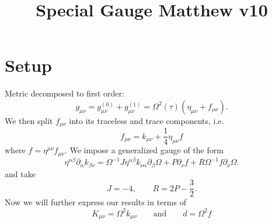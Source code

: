 \documentclass[10pt,letterpaper]{article}
\title{Special Gauge Matthew v10}
\date{}
\begin{document}
\maketitle
\noindent
\section*{Setup}
Metric decomposed to first order:
\begin{equation}
g_{\mu\nu} = g^{(0)}_{\mu\nu} + g^{(1)}_{\mu\nu} = \Omega^2(\tau)(\eta_{\mu\nu}+f_{\mu\nu}).
\end{equation}
We then split $f_{\mu\nu}$ into its traceless and trace components, i.e.
\begin{equation}
	f_{\mu\nu} = k_{\mu\nu} + \frac 14 \eta_{\mu\nu}f
\end{equation}
where $f = \eta^{\mu\nu}f_{\mu\nu}$. 
We impose a generalized gauge of the form
\begin{equation}
	\eta^{\alpha\beta}\partial_{\alpha}k_{\beta\nu} = \Omega^{-1} J \eta^{\alpha\beta}k_{\nu\alpha}\partial_\beta \Omega + P \partial_\nu f + R \Omega^{-1} f \partial_\nu \Omega.
\end{equation}
 and take
\begin{equation}
	J=-4,\qquad R = 2P-\frac32.
\end{equation}
Now we will further express our results in terms of 
\begin{equation}
	K_{\mu\nu} = \Omega^2 k_{\mu\nu}\qquad\text{and}\qquad
	d = \Omega^2 f
\end{equation}
\end{document}
